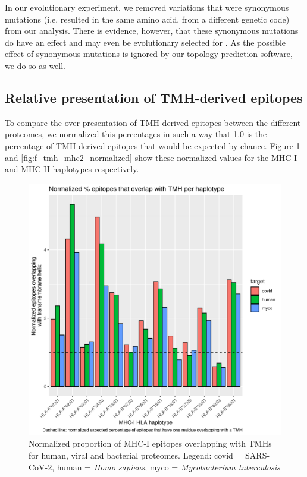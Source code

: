%
In our evolutionary experiment, 
we removed variations that were synonymous mutations (i.e.
resulted in the same amino acid, from a different genetic code) 
from our analysis.
There is evidence, however, that these synonymous mutations
do have an effect and may even be evolutionary selected 
for \cite{hunt2009silent}.
As the possible effect of synonymous mutations is ignored by our
topology prediction software, we do so as well.

\clearpage

\subsection{Relative presentation of TMH-derived epitopes}

To compare the over-presentation of TMH-derived epitopes between the
different proteomes, we normalized this percentages in such a
way that 1.0 is the percentage of TMH-derived epitopes that would 
be expected by chance. 
Figure \ref{fig:f_tmh_mhc1_normalized} and \ref{fig:f_tmh_mhc2_normalized}
show these normalized values for the MHC-I and MHC-II haplotypes respectively.

\begin{figure}[!htbp]
  \includegraphics[width=\textwidth]{bbbq_1_smart_results/fig_f_tmh_mhc1_2_normalized.png}
  \caption{
    Normalized proportion of MHC-I epitopes overlapping with TMHs
    for human, viral and bacterial proteomes.
    Legend: covid = SARS-CoV-2,
    human = \emph{Homo sapiens}, 
    myco = \emph{Mycobacterium tuberculosis}
  }
  \label{fig:f_tmh_mhc1_normalized}
\end{figure}

